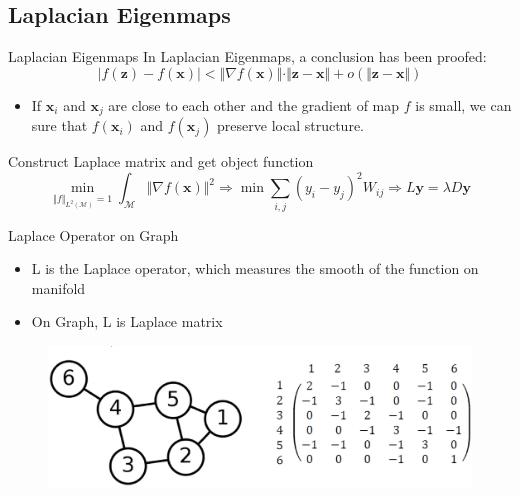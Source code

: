 \documentclass{beamer}
\newcommand{\bol}[1]{\textbf{#1}}
\begin{document}
\begin{darkframes}
    \subsection{Laplacian Eigenmaps}
    \begin{frame}{Laplacian Eigenmaps}
    In Laplacian Eigenmaps, a conclusion has been proofed: \\
    \begin{displaymath}
    	\vert f(\bol{z} ) - f(\bol{x})\vert < \Vert \nabla f(\bol{x}) \Vert\cdot \Vert \bol{z} - \bol{x} \Vert + o(\Vert \bol{z} - \bol{x} \Vert)
    \end{displaymath}
    \begin{itemize}
    \item If $\bol{x}_i$ and $\bol{x}_j$ are close to each other and the gradient of map $f$ is small, we can sure that $f(\bol{x}_i)$ and $f(\bol{x}_j)$ preserve local structure.
    \end{itemize}
    Construct Laplace matrix and get object function
    \begin{displaymath}
    	\min_{\Vert f \Vert_{L^2(\mathcal{M})} = 1}\int_{\mathcal{M}}\Vert\nabla f(\bol{x})\Vert^2 \Rightarrow\min\sum_{i,j}(y_i - y_j)^2W_{ij} \Rightarrow L\bol{y} = \lambda D\bol{y}
    \end{displaymath}
    \end{frame}
    
    \begin{frame}{Laplace Operator on Graph}
    \begin{itemize}
    	\item L is the Laplace operator, which measures the smooth of the function on manifold
    	\item On Graph, L is Laplace matrix
    \end{itemize}
    \begin{figure}
    \centering
    \includegraphics[scale=0.2]{./figs/fig9.eps}
    \end{figure}
    \end{frame}
    

\end{darkframes}
\end{document}
